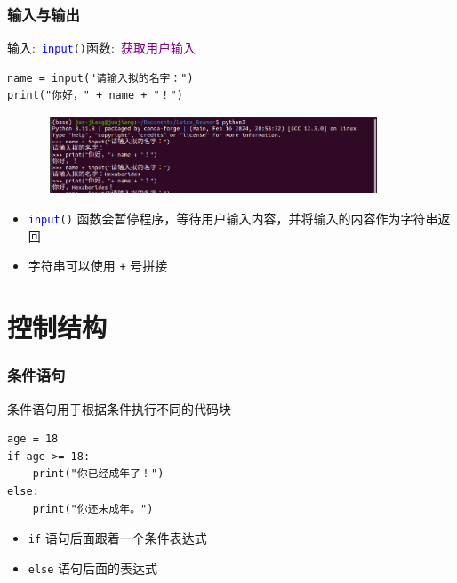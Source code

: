 %
\begin{frame}[fragile]
    \frametitle{输入与输出}
    输入:~\texttt{\textcolor{blue}{input}()}函数:~\textcolor{purple}{获取用户输入}
    \begin{lstlisting}[style=pythonstyle]
name = input("请输入拟的名字：")
print("你好，" + name + "！")
    \end{lstlisting}
\begin{figure}[h!]
\centering
\includegraphics[height=0.9in, width=4.0in, viewport=0 9 901 211,clip]{Figures/python_Input-output.png}
\label{Python-Input_Output}
\end{figure}
\vspace*{-0.15in}
    \begin{itemize}
	    \item \texttt{\textcolor{blue}{input}()} 函数会暂停程序，等待用户输入内容，并将输入的内容作为字符串返回
	    \item 字符串可以使用 \texttt{+} 号拼接
    \end{itemize}
\end{frame}
%
\section{控制结构}
\begin{frame}[fragile]
    \frametitle{条件语句}
    条件语句用于根据条件执行不同的代码块
    \begin{lstlisting}[style=pythonstyle]
age = 18
if age >= 18:
    print("你已经成年了！")
else:
    print("你还未成年。")
    \end{lstlisting}
    \begin{itemize}
	    \item \texttt{if} 语句后面跟着一个条件表达式\\
		    {\fontsize{8.2pt}{4.2pt}}
	    \item \texttt{else} 语句后面的表达式\\
		    {\fontsize{8.2pt}{4.2pt}}
    \end{itemize}
\end{frame}

